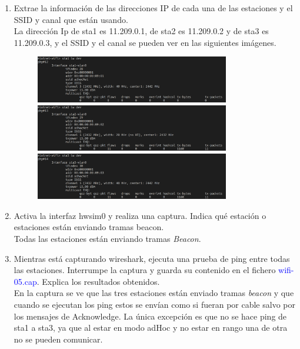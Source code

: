 \documentclass[12pt, a4paper]{report}
\begin{document}
\begin{enumerate}
	\item Extrae la información de las direcciones IP de cada una de las estaciones y el SSID y canal que
	están usando.\\
	
	La dirección Ip de sta1 es 11.209.0.1, de sta2 es 11.209.0.2 y de sta3 es 11.209.0.3, y el SSID y el canal se pueden ver en las siguientes imágenes.
	\begin{figure}[H]
		\centering
		\includegraphics[width=0.8\textwidth]{ej4.1_1}\\
		\includegraphics[width=0.8\textwidth]{ej4.1_2}\\
		\includegraphics[width=0.8\textwidth]{ej4.1_3}
	\end{figure}
	\item Activa la interfaz hwsim0 y realiza una captura. Indica qué estación o estaciones están enviando
	tramas beacon.\\
	
	Todas las estaciones están enviando tramas \textit{Beacon}.
	\item Mientras está capturando wireshark, ejecuta una prueba de ping entre todas las estaciones. Interrumpe la captura y guarda su contenido en el fichero \textcolor{blue}{wifi-05.cap}. Explica los resultados
	obtenidos.\\
	
	En la captura se ve que las tres estaciones están enviado tramas \textit{beacon} y que cuando se ejecutan los ping estos se envían como si fueran por cable salvo por los mensajes de Acknowledge. La única excepción es que no se hace ping de sta1 a sta3, ya que al estar en modo adHoc y no estar en rango una de otra no se pueden comunicar.\\
	

\end{enumerate}
\end{document}
